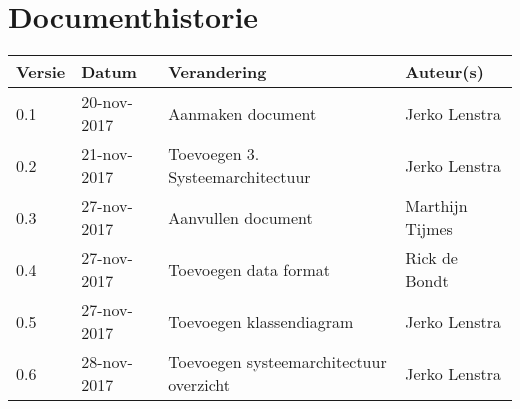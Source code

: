 \section{Documenthistorie}

\begin{tabularx}{\textwidth}{| l | l | X | l |}
	\hline
	\textbf{Versie} & \textbf{Datum} & \textbf{Verandering} & \textbf{Auteur(s)} \\ \hline
	0.1	& 20-nov-2017 & Aanmaken document & Jerko Lenstra \\ \hline
    0.2 & 21-nov-2017 & Toevoegen 3. Systeemarchitectuur & Jerko Lenstra \\ \hline
    0.3 & 27-nov-2017 & Aanvullen document & Marthijn Tijmes \\ \hline
    0.4 & 27-nov-2017 & Toevoegen data format & Rick de Bondt \\ \hline
    0.5 & 27-nov-2017 & Toevoegen klassendiagram & Jerko Lenstra \\ \hline
    0.6 & 28-nov-2017 & Toevoegen systeemarchitectuur overzicht & Jerko Lenstra \\ \hline

\end{tabularx}
